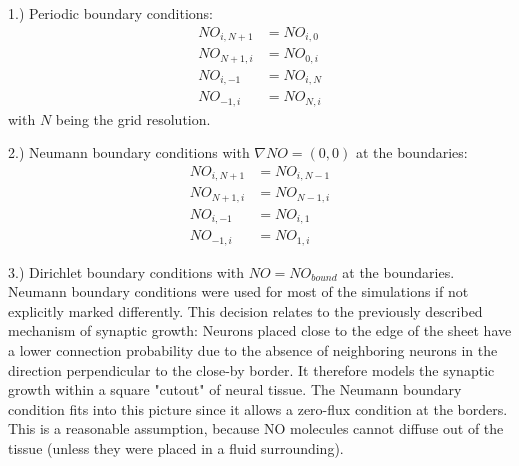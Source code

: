 \documentclass[10pt,a4paper]{article}
\begin{document}
1.) Periodic boundary conditions:
\begin{align}
NO_{i,N+1} &= NO_{i,0} \label{Periodic_Cond_1} \\
NO_{N+1,i} &= NO_{0,i} \label{Periodic_Cond_2} \\
NO_{i,-1} &= NO_{i,N} \label{Periodic_Cond_3} \\
NO_{-1,i} &= NO_{N,i} \label{Periodic_Cond_4}
\end{align}
with $N$ being the grid resolution.

2.) Neumann boundary conditions with $\nabla NO = (0,0)$ at the boundaries:
\begin{align}
NO_{i,N+1} &= NO_{i,N-1} \label{Neumann_Cond_1} \\
NO_{N+1,i} &= NO_{N-1,i} \label{Neumann_Cond_2} \\
NO_{i,-1} &= NO_{i,1} \label{Neumann_Cond_3} \\
NO_{-1,i} &= NO_{1,i} \label{Neumann_Cond_4}
\end{align}

3.) Dirichlet boundary conditions with $NO = NO_{bound}$ at the boundaries.\\
Neumann boundary conditions were used for most of the simulations if not explicitly marked differently. This decision relates to the previously described mechanism of synaptic growth: Neurons placed close to the edge of the sheet have a lower connection probability due to the absence of neighboring neurons in the direction perpendicular to the close-by border. It therefore models the synaptic growth within a square "cutout" of neural tissue. The Neumann boundary condition fits into this picture since it allows a zero-flux condition at the borders. This is a reasonable assumption, because NO molecules cannot diffuse out of the tissue (unless they were placed in a fluid surrounding).
\end{document}
